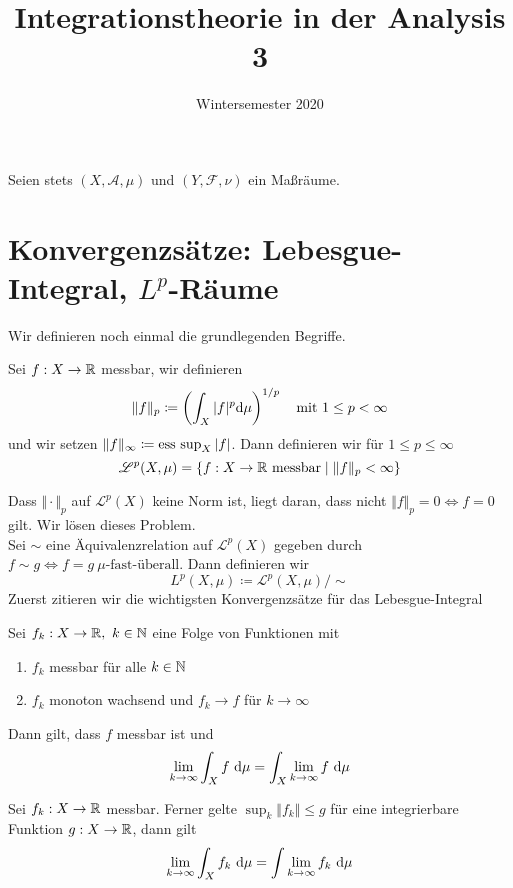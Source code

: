\documentclass{scrartcl}
\title{Integrationstheorie in der Analysis 3}
\date{Wintersemester 2020}
\author{}
\begin{document}
\maketitle
Seien stets $(X,\mathscr{A},\mu)$ und $(Y,\mathscr{F},\nu)$ ein Maßräume.
\section{Konvergenzsätze: Lebesgue-Integral, $L^p$-Räume}
Wir definieren noch einmal die grundlegenden Begriffe.
    \begin{defn} Sei $f:X\to \mathbb{R}$ messbar, wir definieren 
        \[
        \Vert f\Vert_p \coloneqq \left(\int_X \vert f\vert^p \D \mu\right)^{1/p} \quad \mathrm{mit } \ 1\le p<\infty    
        \]
        und wir setzen $\Vert f\Vert_\infty \coloneqq \operatorname{\operatorname{ess \ sup}}_X \vert f\vert$. Dann definieren wir für $1\le p\le \infty$
        \[
        \mathscr{L}^p(X,\mu) = \{f:X\to \R \ \mathrm{messbar} \mid \Vert f\Vert_p<\infty\}    
        \]
    \end{defn}
    Dass $\Vert \cdot\Vert_p$ auf $\mathscr{L}^p(X)$ keine Norm ist, liegt daran, dass 
    nicht $\Vert f\Vert_p = 0 \iff f=0$ gilt. Wir lösen dieses Problem.\\
    Sei $\sim$ eine Äquivalenzrelation auf $\mathscr{L}^p(X)$ gegeben durch $f\sim g\iff f=g \ \mu\text{-fast-überall}$. Dann definieren wir
    \[
    L^p(X,\mu) \coloneqq \mathscr{L}^p(X,\mu)/\sim    
    \] 
     Zuerst zitieren wir die wichtigsten 
    Konvergenzsätze für das Lebesgue-Integral
    \begin{satz} Sei $f_k:X\to \mathbb{R}, \ k\in \mathbb{N}$ eine Folge von Funktionen mit 
    \begin{enumerate}
        \item $f_k$ messbar für alle $k\in \mathbb{N}$
        \item $f_k$ monoton wachsend und $f_k \to f$ für $k\to \infty$
    \end{enumerate} Dann gilt, dass $f$ messbar ist und
        \[
        \lim_{k\to \infty} \int_X f\ \mathrm{d} \mu = \int_X \lim_{k\to \infty} f\ \mathrm{d} \mu    
        \]
    \end{satz}
    \begin{satz} Sei $f_k:X\to \mathbb{R}$ messbar. Ferner gelte ${\sup_k \Vert f_k\Vert \le g}$ für eine integrierbare Funktion $g:X\to \mathbb{R}$, dann gilt
        \[
        \lim_{k\to \infty} \int_X f_k \ \mathrm{d} \mu = \int \lim_{k\to\infty } f_k \ \mathrm{d} \mu    
        \]
    \end{satz}
\end{document}

